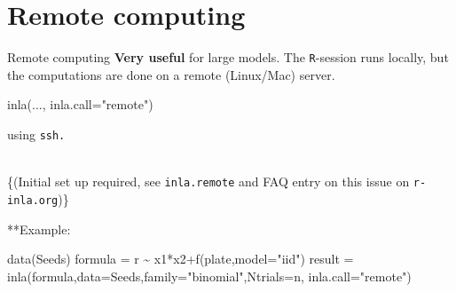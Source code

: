 \documentclass[
  ignorenonframetext,
  handout]{beamer}
\newenvironment{Shaded}{\begin{snugshade}}{\end{snugshade}}
\newcommand{\AttributeTok}[1]{\textcolor[rgb]{0.77,0.63,0.00}{#1}}
\newcommand{\FunctionTok}[1]{\textcolor[rgb]{0.00,0.00,0.00}{#1}}
\newcommand{\NormalTok}[1]{#1}
\newcommand{\OtherTok}[1]{\textcolor[rgb]{0.56,0.35,0.01}{#1}}
\newcommand{\SpecialCharTok}[1]{\textcolor[rgb]{0.00,0.00,0.00}{#1}}
\newcommand{\StringTok}[1]{\textcolor[rgb]{0.31,0.60,0.02}{#1}}
\begin{document}
\hypertarget{remote-computing}{%
\section{Remote computing}\label{remote-computing}}

\begin{frame}[fragile]{Remote computing}
\protect\hypertarget{remote-computing-1}{}
\textbf{Very useful} for large models. The \texttt{R}-session runs
locally, but the computations are done on a remote (Linux/Mac) server.\\

\begin{Shaded}
\begin{Highlighting}[]
\FunctionTok{inla}\NormalTok{(..., }\AttributeTok{inla.call=}\StringTok{"remote"}\NormalTok{)}
\end{Highlighting}
\end{Shaded}

using \texttt{ssh.}\\
\strut \\
\{\scriptsize (Initial set up required, see \texttt{inla.remote} and FAQ
entry on this issue on \texttt{r-inla.org})\}

**Example: \tiny

\begin{Shaded}
\begin{Highlighting}[]
\FunctionTok{data}\NormalTok{(Seeds)}
\NormalTok{formula }\OtherTok{=}\NormalTok{ r }\SpecialCharTok{\textasciitilde{}}\NormalTok{ x1}\SpecialCharTok{*}\NormalTok{x2}\SpecialCharTok{+}\FunctionTok{f}\NormalTok{(plate,}\AttributeTok{model=}\StringTok{"iid"}\NormalTok{)}
\NormalTok{result }\OtherTok{=} \FunctionTok{inla}\NormalTok{(formula,}\AttributeTok{data=}\NormalTok{Seeds,}\AttributeTok{family=}\StringTok{"binomial"}\NormalTok{,}\AttributeTok{Ntrials=}\NormalTok{n, }\AttributeTok{inla.call=}\StringTok{"remote"}\NormalTok{)}
\end{Highlighting}
\end{Shaded}

\normalsize
\end{frame}
\end{document}
